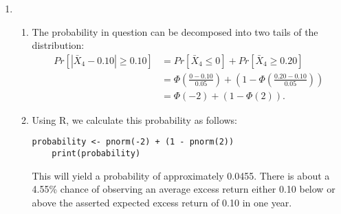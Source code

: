 \documentclass[10pt]{article}
\newenvironment{problem}[2][Problem]{\begin{trivlist}
\item[\hskip \labelsep {\bfseries #1}\hskip \labelsep {\bfseries #2.}]}{\end{trivlist}}
\begin{document}
\begin{problem}{5}
\begin{enumerate}
            \item \hfill
                \begin{enumerate}
                    \item 
                        The probability in question can be decomposed into two tails of the distribution:
                    \begin{align*}
                        Pr[|\bar{X}_4 - 0.10| \geq 0.10] &= Pr[\bar{X}_4 \leq 0] + Pr[\bar{X}_4 \geq 0.20] \\
                        &= \Phi\left(\frac{0 - 0.10}{0.05}\right) + \left(1 - \Phi\left(\frac{0.20 - 0.10}{0.05}\right)\right) \\
                        &= \Phi(-2) + (1 - \Phi(2)).
                    \end{align*}
                \item Using R, we calculate this probability as follows:
                    \begin{lstlisting}[style=Rstyle]
    probability <- pnorm(-2) + (1 - pnorm(2))
    print(probability)
                    \end{lstlisting}
                    This will yield a probability of approximately 0.0455. There is about a 4.55\% chance of observing an average excess return either 0.10 below or above the asserted expected excess return of 0.10 in one year. 
            \end{enumerate}
    \end{enumerate}
\end{problem}
\end{document}
